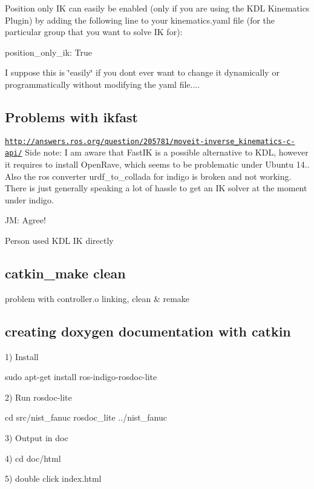 Position only I\-K can easily be enabled (only if you are using the K\-D\-L Kinematics Plugin) by adding the following line to your kinematics.\-yaml file (for the particular group that you want to solve I\-K for)\-:

position\-\_\-only\-\_\-ik\-: True

I suppose this is \char`\"{}easily\char`\"{} if you dont ever want to change it dynamically or programmatically without modifying the yaml file....

\subsection*{Problems with ikfast }

\href{http://answers.ros.org/question/205781/moveit-inverse_kinematics-c-api/}{\tt http\-://answers.\-ros.\-org/question/205781/moveit-\/inverse\-\_\-kinematics-\/c-\/api/} Side note\-: I am aware that Fast\-I\-K is a possible alternative to K\-D\-L, however it requires to install Open\-Rave, which seems to be problematic under Ubuntu 14.. Also the ros converter urdf\-\_\-to\-\_\-collada for indigo is broken and not working. There is just generally speaking a lot of hassle to get an I\-K solver at the moment under indigo.

J\-M\-: Agree!

Person used K\-D\-L I\-K directly

\subsection*{catkin\-\_\-make clean }

problem with controller.\-o linking, clean \& remake

\subsection*{creating doxygen documentation with catkin }

1) Install \begin{DoxyVerb}sudo apt-get install ros-indigo-rosdoc-lite 
\end{DoxyVerb}


2) Run rosdoc-\/lite \begin{DoxyVerb}cd src/nist_fanuc
rosdoc_lite ../nist_fanuc
\end{DoxyVerb}


3) Output in doc

4) cd doc/html

5) double click index.\-html

